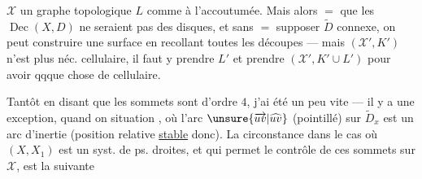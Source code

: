 $\mathcal X$ un graphe topologique $L$ comme
à l'accoutumée. Mais alors $=$
que les $\operatorname{Dec}(X,D)$ ne seraient pas
des disques, et sans $=$ supposer $\widetilde D$
connexe, on peut construire une
 surface 
en recollant toutes les
découpes --- mais $(\mathcal X',K')$ n'est plus
néc. cellulaire, il faut y prendre
$L'$ et prendre $(\mathcal X',K'\cup L')$ pour avoir
qqque chose de cellulaire.

Tantôt en disant que les sommets 
sont d'ordre $4$, j'ai été un peu vite ---
il y a une exception, quand on
  situation , où  \deleted{\unsure{$\longleftrightarrow$}} l'arc
$\unsure{\overrightarrow{uv}|\widehat{uv}}$ (pointillé) sur
$\widetilde D_x$ est un arc
d'inertie (position
relative \uline{stable} donc). La circonstance
 dans le cas où $(X,X_1)$ est un syst.
de ps. droites, et qui permet le contrôle
de ces sommets sur $\mathcal X$, est la suivante

